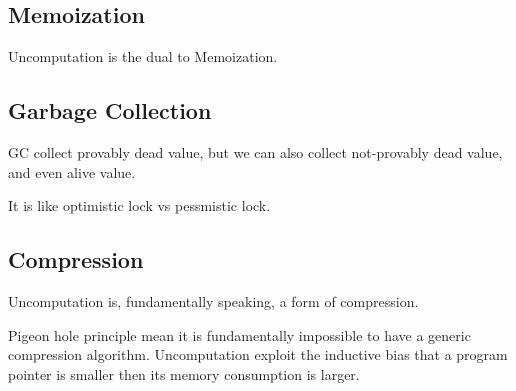 \subsection{Memoization}
Uncomputation is the dual to Memoization.
\subsection{Garbage Collection}
GC collect provably dead value, but we can also collect not-provably dead value, and even alive value.

It is like optimistic lock vs pessmistic lock.
\subsection{Compression}
Uncomputation is, fundamentally speaking, a form of compression.

Pigeon hole principle mean it is fundamentally impossible to have a generic compression algorithm. Uncomputation exploit the inductive bias that a program pointer is smaller then its memory consumption is larger.

